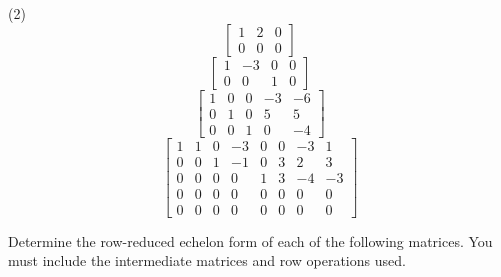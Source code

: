 \begin{tasks}[resume, style=enumerate](2)
\task
  \begin{displaymath}
    \left[\begin{matrix}1 & 2 & 0\\0 & 0 & 0\end{matrix}\right]
  \end{displaymath}
\task
  \begin{displaymath}
    \left[\begin{matrix}1 & -3 & 0 & 0\\0 & 0 & 1 & 0\end{matrix}\right]
  \end{displaymath}
\task
  \begin{displaymath}
    \left[\begin{matrix}1 & 0 & 0 & -3 & -6\\0 & 1 & 0 & 5 & 5\\0 & 0 & 1 & 0 & -4\end{matrix}\right]
  \end{displaymath}
\task
  \begin{displaymath}
    \begin{bmatrix}
      1 & 1 & 0 & -3 & 0 & 0 & -3 & 1 \\
      0 & 0 & 1 & -1 & 0 & 3 & 2 & 3 \\
      0 & 0 & 0 & 0 & 1 & 3 & -4 & -3 \\
      0 & 0 & 0 & 0 & 0 & 0 & 0 & 0 \\
      0 & 0 & 0 & 0 & 0 & 0 & 0 & 0
    \end{bmatrix}
  \end{displaymath}
\end{tasks}
Determine the row-reduced echelon form of each of the following
matrices.  You must include the intermediate matrices and row
operations used.

